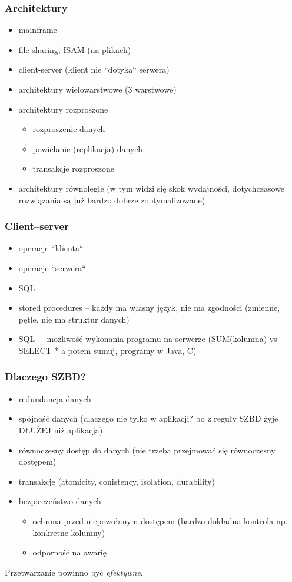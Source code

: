 \documentclass[12pt]{article}
\begin{document}
\subsubsection{Architektury}
\begin{itemize}
\item  mainframe
\item  file sharing, \acs{ISAM} (na plikach)
\item  client-server (klient nie ``dotyka`` serwera)
\item  architektury wielowarstwowe (3 warstwowe)
\item  architektury rozproszone
\begin{itemize}
\item  rozproszenie danych
\item powielanie (replikacja) danych
\item transakcje rozproszone
\end{itemize}
\item  architektury równoległe (w tym widzi się skok wydajności, dotychczasowe rozwiązania są już
   bardzo dobrze zoptymalizowane)
\end{itemize}

\subsubsection{Client--server}
\begin{itemize}
\item operacje ``klienta``
\item operacje ``serwera``
\item \ac{SQL}
\item stored procedures -- każdy ma własny język, nie ma zgodności (zmienne, pętle, nie ma struktur danych)
\item \ac{SQL} + możliwość wykonania programu na serwerze (SUM(kolumna) vs SELECT * a potem sumuj, programy w Java, C)
\end{itemize}

\subsubsection{Dlaczego \acs{SZBD}?}
\begin{itemize}
\item redundancja danych
\item spójność danych (dlaczego nie tylko w aplikacji? bo z reguły \ac{SZBD} żyje DŁUŻEJ niż aplikacja)
\item równoczesny dostęp do danych (nie trzeba przejmować się równoczesny dostępem)
\item transakcje (atomicity, conistency, isolation, durability)
\item bezpieczeństwo danych
\begin{itemize}
\item ochrona przed niepowołanym dostępem (bardzo dokładna kontrola np. konkretne kolumny)
\item odporność na awarię
\end{itemize}
\end{itemize}
Przetwarzanie powinno być \emph{efektywne}.
\end{document}
